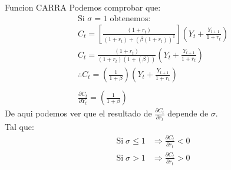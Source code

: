 \documentclass[12pt]{article}
\begin{document}
\begin{ejemplo}{Funcion CARRA}
    Podemos comprobar que: 
    \begin{align*}
        \text{Si $\sigma =1$ obtenemos:}\\
        C_t=[\frac{(1+r_t)}{(1+r_t)+(\beta(1+r_t))^1}](Y_t+\frac{Y_{t+1}}{1+r_t})\\
        C_t=\frac{(1+r_t)}{(1+r_t)(1+(\beta))}(Y_t+\frac{Y_{t+1}}{1+r_t})\\
        \therefore C_t=(\frac{1}{1+\beta})(Y_t+\frac{Y_{t+1}}{1+r_t})\\\\
        \frac{\partial C_t}{\partial Y_t}=(\frac{1}{1+\beta})
    \end{align*}
    De aqui podemos ver que el resultado de $\frac{\partial C_t}{\partial r_t}$ depende de $\sigma$. \\
    Tal que: 
    \begin{equation*}
        \begin{array}{cc}
         \text{Si}\; \sigma \le 1 & \Rightarrow{}   \frac{\partial C_t}{\partial r_t} <0\\
         \text{Si}\; \sigma>1 & \Rightarrow{}   \frac{\partial C_t}{\partial r_t} >0
    \end{array}
    \end{equation*}
    
\end{ejemplo}
\newpage
\end{document}
